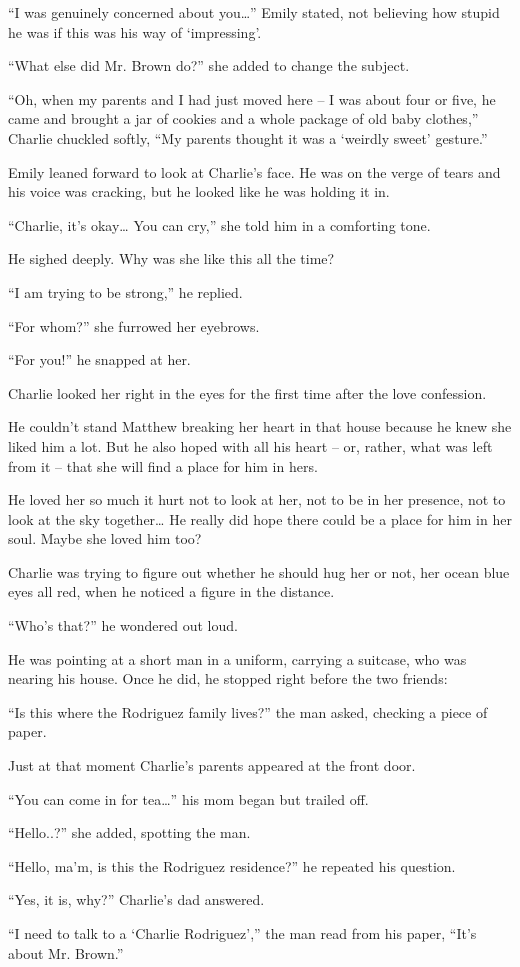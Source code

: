 “I was genuinely concerned about you…” Emily stated, not believing how stupid he was if this was his way of ‘impressing'.

“What else did Mr. Brown do?” she added to change the subject.

“Oh, when my parents and I had just moved here – I was about four or five, he came and brought a jar of cookies and a whole package of old baby clothes,” Charlie chuckled softly, “My parents thought it was a ‘weirdly sweet' gesture.”

Emily leaned forward to look at Charlie's face. He was on the verge of tears and his voice was cracking, but he looked like he was holding it in.

“Charlie, it's okay… You can cry,” she told him in a comforting tone.

He sighed deeply. Why was she like this all the time?

“I am trying to be strong,” he replied.

“For whom?” she furrowed her eyebrows.

“For you!” he snapped at her.

Charlie looked her right in the eyes for the first time after the love confession.

He couldn't stand Matthew breaking her heart in that house because he knew she liked him a lot. But he also hoped with all his heart – or, rather, what was left from it – that she will find a place for him in hers.

He loved her so much it hurt not to look at her, not to be in her presence, not to look at the sky together… He really did hope there could be a place for him in her soul. Maybe she loved him too?

Charlie was trying to figure out whether he should hug her or not, her ocean blue eyes all red, when he noticed a figure in the distance.

“Who's that?” he wondered out loud.

He was pointing at a short man in a uniform, carrying a suitcase, who was nearing his house. Once he did, he stopped right before the two friends:

“Is this where the Rodriguez family lives?” the man asked, checking a piece of paper.

Just at that moment Charlie's parents appeared at the front door.

“You can come in for tea…” his mom began but trailed off.

“Hello..?” she added, spotting the man.

“Hello, ma'm, is this the Rodriguez residence?” he repeated his question.

“Yes, it is, why?” Charlie's dad answered.

“I need to talk to a ‘Charlie Rodriguez',” the man read from his paper, “It's about Mr. Brown.”